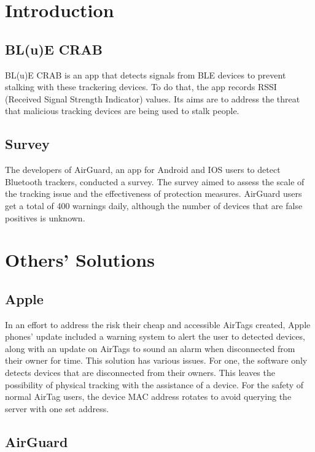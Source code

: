 \documentclass{article}
\begin{document}
\begin{multicols}{2}
    

\section{Introduction}
\subsection{BL(u)E CRAB}
BL(u)E CRAB is an app that detects signals from BLE devices to prevent stalking with these trackering devices. To do that, the app records RSSI (Received Signal Strength Indicator) values. Its aims are to address the threat that malicious tracking devices are being used to stalk people. \cite{conklin2025bl}

\subsection{Survey}
The developers of AirGuard, an app for Android and IOS users to detect Bluetooth trackers, conducted a survey. The survey aimed to assess the scale of the tracking issue and the effectiveness of protection measures. AirGuard users get a total of 400 warnings daily, although the number of devices that are false positives is unknown. \cite{turk2023stop}


\section{Others' Solutions}

\subsection{Apple}
In an effort to address the risk their cheap and accessible AirTags created, Apple phones' update included a warning system to alert the user to detected devices, along with an update on AirTags to sound an alarm when disconnected from their owner for time. This solution has various issues. For one, the software only detects devices that are disconnected from their owners. This leaves the possibility of physical tracking with the assistance of a device. For the safety of  normal AirTag users, the device MAC address rotates to avoid querying the server with one set address.
\cite{rescor2023def}


\subsection{AirGuard}


\end{multicols}
\end{document}
